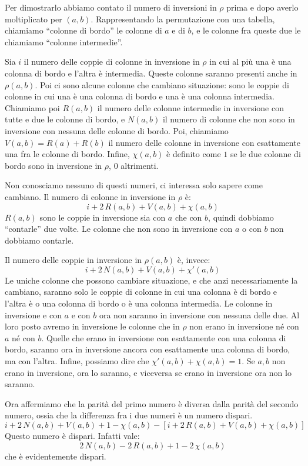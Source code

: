 Per dimostrarlo abbiamo contato il numero di inversioni in $\rho$ prima e dopo averlo moltiplicato per $(a,b)$.
Rappresentando la permutazione con una tabella, chiamiamo ``colonne di bordo'' le colonne di $a$ e di $b$, e le colonne fra queste due le chiamiamo ``colonne intermedie''.

Sia $i$ il numero delle coppie di colonne in inversione in $\rho$ in cui al pi\`u una \`e una colonna di bordo e l'altra \`e intermedia.
Queste colonne saranno presenti anche in $\rho (a,b)$.
Poi ci sono alcune colonne che cambiano situazione: sono le coppie di colonne in cui una \`e una colonna di bordo e una \`e una colonna intermedia.
Chiamiamo poi $R(a,b)$ il numero delle colonne intermedie in inversione con tutte e due le colonne di bordo, e $N(a,b)$ il numero di colonne che non sono in inversione con nessuna delle colonne di bordo.
Poi, chiamiamo $V(a,b) = R(a) + R(b)$ il numero delle colonne in inversione con esattamente una fra le colonne di bordo.
Infine, $\chi(a,b)$ \`e definito come $1$ se le due colonne di bordo sono in inversione in $\rho$, $0$ altrimenti.

Non conosciamo nessuno di questi numeri, ci interessa solo sapere come cambiano.
Il numero di colonne in inversione in $\rho$ \`e:
\[
i + 2 \, R(a,b) + V(a,b) + \chi(a,b)
\]
$R(a,b)$ sono le coppie in inversione sia con $a$ che con $b$, quindi dobbiamo ``contarle'' due volte.
Le colonne che non sono in inversione con $a$ o con $b$ non dobbiamo contarle.

Il numero delle coppie in inversione in $\rho (a,b)$ \`e, invece:
\[
i + 2 \, N(a,b) + V(a,b) + \chi'(a,b)
\]
Le uniche colonne che possono cambiare situazione, e che anzi necessariamente la cambiano, saranno solo le coppie di colonne in cui una colonna \`e di bordo e l'altra \`e o una colonna di bordo o \`e una colonna intermedia.
Le colonne in inversione e con $a$ e con $b$ ora non saranno in inversione con nessuna delle due.
Al loro posto avremo in inversione le colonne che in $\rho$ non erano in inversione n\'e con $a$ n\'e con $b$.
Quelle che erano in inversione con esattamente con una colonna di bordo, saranno ora in inversione ancora con esattamente una colonna di bordo, ma con l'altra.
Infine, possiamo dire che $\chi'(a,b) + \chi(a,b) = 1$.
Se $a,b$ non erano in inversione, ora lo saranno, e viceversa se erano in inversione ora non lo saranno.

Ora affermiamo che la parit\`a del primo numero \`e diversa dalla parit\`a del secondo numero, ossia che la differenza fra i due numeri \`e un numero dispari.
\[
i + 2 \, N(a,b) + V(a,b) + 1 - \chi(a,b) - \left[ i + 2 \, R(a,b) + V(a,b) + \chi (a,b) \right]
\]
Questo numero \`e dispari.
Infatti vale:
\[
2 \, N(a,b) - 2 \, R(a,b) + 1 - 2 \, \chi(a,b)
\]
che \`e evidentemente dispari.

